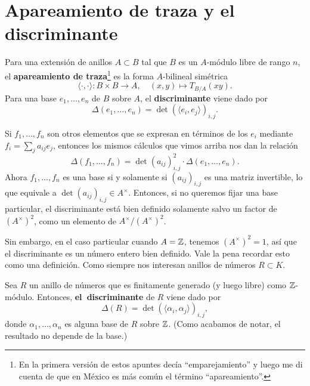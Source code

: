 
\section{Apareamiento de traza y el discriminante}

\begin{definicion}
  Para una extensión de anillos $A \subset B$ tal que $B$ es un $A$-módulo libre
  de rango $n$, el \textbf{apareamiento de traza}\footnote{En la primera
    versión de estos apuntes decía ``emparejamiento'' y luego me di cuenta de
    que en México es más común el término ``apareamiento''.}  es la forma
  $A$-bilineal simétrica
  \[ \langle\cdot,\cdot\rangle\colon B\times B\to A, \quad
     (x,y) \mapsto T_{B/A} (xy). \]
  Para una base $e_1,\ldots,e_n$ de $B$ sobre $A$, el \textbf{discriminante}
  viene dado por
  \[ \Delta (e_1,\ldots,e_n) =
     \det (\langle e_i,e_j\rangle)_{i,j}. \]
\end{definicion}

Si $f_1, \ldots, f_n$ son otros elementos que se expresan en términos de los
$e_i$ mediante $f_i = \sum_j a_{ij} e_j$, entonces los mismos cálculos que vimos
arriba nos dan la relación
\[ \Delta (f_1,\ldots,f_n) =
   \det (a_{ij})_{i,j}^2 \cdot \Delta (e_1,\ldots,e_n). \]
Ahora $f_1,\ldots,f_n$ es una base si y solamente si $(a_{ij})_{i,j}$ es una
matriz invertible, lo que equivale a $\det (a_{ij})_{i,j} \in A^\times$.
Entonces, si no queremos fijar una base particular, el discriminante está bien
definido solamente salvo un factor de $(A^\times)^2$, como un elemento de
$A^\times/(A^\times)^2$.

Sin embargo, en el caso particular cuando $A = \mathbb{Z}$, tenemos $(A^\times)^2 = 1$,
así que el discriminante es un número entero bien definido. Vale la pena
recordar esto como una definición. Como siempre nos interesan anillos de
números $R \subset K$.

\begin{definicion}
  Sea $R$ un anillo de números que es finitamente generado (y luego libre) como
  $\mathbb{Z}$-módulo. Entonces, \textbf{el~discriminante} de $R$ viene dado por
  $$\Delta (R) = \det (\langle \alpha_i, \alpha_j\rangle)_{i,j},$$
  donde $\alpha_1,\ldots,\alpha_n$ es alguna base de $R$ sobre $\mathbb{Z}$.
  (Como acabamos de notar, el resultado no depende de la base.)
\end{definicion}

